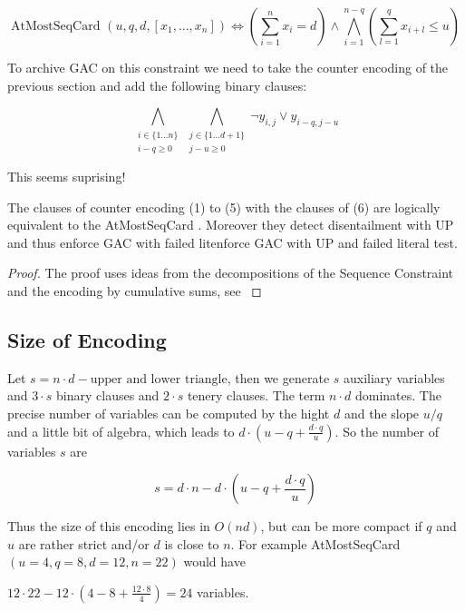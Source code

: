 \documentclass[]{llncs}
\newcommand{\AtMostSeqCard}{AtMostSeqCard }
\begin{document}
$$ \text{\AtMostSeqCard}(u,q,d,[x_{1},\ldots,x_{n}]) \iff (\sum_{i=1}^n
x_{i} = d) \wedge \bigwedge_{i=1}^{n-q}(\sum_{l=1}^q x_{i+l} \leq u )$$

To archive GAC on this constraint we need to take the counter encoding
of the previous section and add the following binary clauses:

\begin{equation}
    \bigwedge_{\substack{i \in \{1 \ldots n\} \\ i-q \geq 0}}
    \bigwedge_{\substack{j\in\{1\ldots d+1\}\\ j-u \geq 0}}
    \neg y_{i,j} \vee y_{i-q,j-u}
\end{equation}               

This seems suprising! 

\begin{theorem}
    The clauses of counter encoding (1) to (5) with the clauses of (6)
    are logically equivalent to the \AtMostSeqCard. Moreover they detect
    disentailment with UP and thus enforce GAC with failed litenforce
    GAC with UP and failed literal test. 
\end{theorem}


\begin{proof}
    The proof uses ideas from the decompositions of the Sequence
    Constraint \cite{Baccus07} and the encoding by cumulative sums, see
    \cite{Brand07}
\end{proof}


\subsection{Size of Encoding} 

Let $s = n\cdot d-\text{upper and lower triangle}$, then we generate $s$
auxiliary variables and $3\cdot s$ binary clauses and $2\cdot s$ tenery
clauses. The term $n\cdot d$ dominates. The precise number of variables
can be computed by the hight $d$ and the slope $u/q$ and a little bit of
algebra, which leads to $d\cdot(u-q+\frac{d \cdot q}{u}) $. So the
number of variables $s$ are

$$ s = d \cdot n - d \cdot(u-q+\frac{d \cdot q}{u}) $$

Thus the size of this encoding lies in $O(nd)$, but can be more compact
if $q$ and $u$ are rather strict and/or $d$ is close to $n$. For example
\AtMostSeqCard$(u=4,q=8,d=12,n=22)$ would have 

$ 12\cdot 22- 12\cdot ( 4-8+\frac{12 \cdot 8}{4}) = 24$ variables. 
\end{document}
